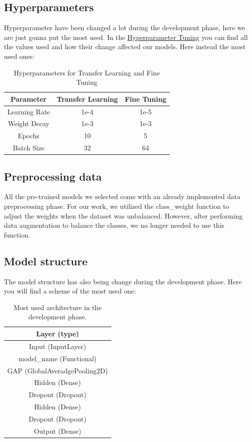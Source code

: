 \documentclass[11pt]{article}
\begin{document}
\subsection{Hyperparameters}
Hyperparameter have been changed a lot during the development phase, here we are just gonna put the most used. In the \hyperref[hyperparametertuning]{Hyperparameter Tuning} you can find all the values used and how their change affected our models.
Here instead the most used ones:\\
\begin{table}[h!]
\centering
\begin{tabular}{|c|c|c|}
\hline
\textbf{Parameter} & \textbf{Transfer Learning} & \textbf{Fine Tuning} \\ \hline
Learning Rate & 1e-4 & 1e-5 \\ \hline
Weight Decay & 1e-3 & 1e-3 \\ \hline
Epochs & 10 & 5 \\ \hline
Batch Size & 32 & 64 \\ \hline
\end{tabular}
\caption{Hyperparameters for Transfer Learning and Fine Tuning}
\end{table}
\subsection{Preprocessing data}
All the pre-trained models we selected come with an already implemented data preprocessing phase. For our work, we utilized the class\_weight function to adjust the weights when the dataset was unbalanced. However, after performing data augmentation to balance the classes, we no longer needed to use this function.
\subsection{Model structure}
The model structure has also being change during the development phase.
Here you will find a scheme of the most used one:
\begin{table}[h!]
\centering
\begin{tabular}{|c|}
\hline
\textbf{Layer (type)} \\ \hline
Input (InputLayer)\\ \hline
model\_name (Functional)\\ \hline
GAP (GlobalAveradgePooling2D)\\ \hline
Hidden (Dense)\\ \hline
Dropout (Dropout)\\ \hline
Hidden (Dense)\\ \hline
Dropout (Dropout)\\ \hline
Output (Dense)\\ \hline
\end{tabular}

\caption{Most used architecture in the development phase.}
\end{table}
\end{document}
